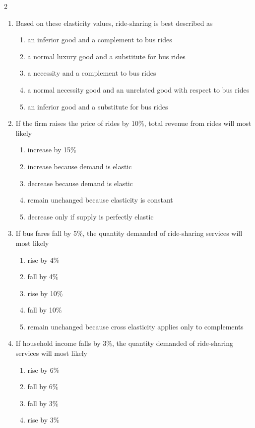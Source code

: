 \documentclass[10pt]{article}
\newenvironment{choiceslist}
  {\begin{enumerate}[label=(\Alph*), leftmargin=1.6em, itemsep=0.12em, topsep=0.18em, parsep=0pt]}
  {\end{enumerate}}
\newenvironment{stimulus}
  {\begin{center}\begin{minipage}{0.96\columnwidth}\footnotesize\itshape\setlength{\tabcolsep}{3pt}\renewcommand{\arraystretch}{0.96}}
  {\end{minipage}\end{center}}
\begin{document}
\begin{multicols*}{2}
\begin{stimulus}
\end{stimulus}
\begin{enumerate}[resume*=apq, leftmargin=*, itemsep=0.85em, topsep=0.2em, parsep=0pt]
\item Based on these elasticity values, ride-sharing is best described as
\begin{choiceslist}
\item an inferior good and a complement to bus rides
\item a normal luxury good and a substitute for bus rides
\item a necessity and a complement to bus rides
\item a normal necessity good and an unrelated good with respect to bus rides
\item an inferior good and a substitute for bus rides
\end{choiceslist}
\item If the firm raises the price of rides by 10\%, total revenue from rides will most likely
\begin{choiceslist}
\item increase by 15\%
\item increase because demand is elastic
\item decrease because demand is elastic
\item remain unchanged because elasticity is constant
\item decrease only if supply is perfectly elastic
\end{choiceslist}
\item If bus fares fall by 5\%, the quantity demanded of ride-sharing services will most likely
\begin{choiceslist}
\item rise by 4\%
\item fall by 4\%
\item rise by 10\%
\item fall by 10\%
\item remain unchanged because cross elasticity applies only to complements
\end{choiceslist}
\item If household income falls by 3\%, the quantity demanded of ride-sharing services will most likely
\begin{choiceslist}
\item rise by 6\%
\item fall by 6\%
\item fall by 3\%
\item rise by 3\%

\end{choiceslist}
\end{enumerate}
\end{multicols*}
\end{document}
